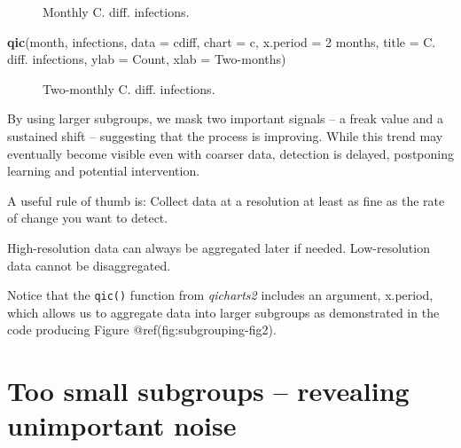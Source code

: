 \documentclass[
]{book}
\makeatletter
\newenvironment{Shaded}{\begin{snugshade}}{\end{snugshade}}
\newcommand{\AttributeTok}[1]{\textcolor[rgb]{0.13,0.29,0.53}{#1}}
\newcommand{\FunctionTok}[1]{\textcolor[rgb]{0.13,0.29,0.53}{\textbf{#1}}}
\newcommand{\NormalTok}[1]{#1}
\newcommand{\StringTok}[1]{\textcolor[rgb]{0.31,0.60,0.02}{#1}}
\newcommand*\pandocbounded[1]{%
  \sbox\pandoc@box{#1}%
  \Gscale@div\@tempa{\textheight}{\dimexpr\ht\pandoc@box+\dp\pandoc@box\relax}%
  \Gscale@div\@tempb{\linewidth}{\wd\pandoc@box}%
  \ifdim\@tempb\p@<\@tempa\p@\let\@tempa\@tempb\fi%
  \ifdim\@tempa\p@<\p@\scalebox{\@tempa}{\usebox\pandoc@box}%
  \else\usebox{\pandoc@box}%
  \fi%
}
\makeatother
\begin{document}
\begin{figure}
\centering
\pandocbounded{}
\caption{Monthly C. diff. infections.}
\end{figure}

\begin{Shaded}
\begin{Highlighting}[]
\FunctionTok{qic}\NormalTok{(month, infections, }
    \AttributeTok{data     =}\NormalTok{ cdiff, }
    \AttributeTok{chart    =} \StringTok{\textquotesingle{}c\textquotesingle{}}\NormalTok{,}
    \AttributeTok{x.period =} \StringTok{\textquotesingle{}2 months\textquotesingle{}}\NormalTok{,}
    \AttributeTok{title    =} \StringTok{\textquotesingle{}C. diff. infections\textquotesingle{}}\NormalTok{,}
    \AttributeTok{ylab     =} \StringTok{\textquotesingle{}Count\textquotesingle{}}\NormalTok{,}
    \AttributeTok{xlab     =} \StringTok{\textquotesingle{}Two{-}months\textquotesingle{}}\NormalTok{)}
\end{Highlighting}
\end{Shaded}

\begin{figure}
\centering
\pandocbounded{}
\caption{Two-monthly C. diff. infections.}
\end{figure}

By using larger subgroups, we mask two important signals -- a freak
value and a sustained shift -- suggesting that the process is improving.
While this trend may eventually become visible even with coarser data,
detection is delayed, postponing learning and potential intervention.

A useful rule of thumb is: Collect data at a resolution at least as fine
as the rate of change you want to detect.

High-resolution data can always be aggregated later if needed.
Low-resolution data cannot be disaggregated.

Notice that the \texttt{qic()} function from \emph{qicharts2} includes
an argument, x.period, which allows us to aggregate data into larger
subgroups as demonstrated in the code producing Figure
@ref(fig:subgrouping-fig2).

\section{Too small subgroups -- revealing unimportant
noise}\label{too-small-subgroups-revealing-unimportant-noise}
\end{document}
